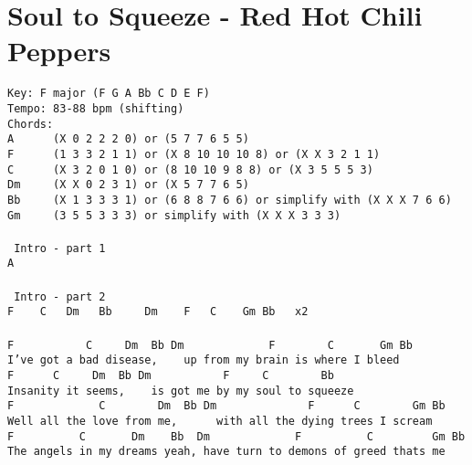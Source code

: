 \newpage
\section{Soul to Squeeze - Red Hot Chili Peppers}
\label{Soul to Squeeze - Red Hot Chili Peppers}
\texttt{Key:\ F\ major\ (F\ G\ A\ Bb\ C\ D\ E\ F)\\
Tempo:\ 83-88\ bpm\ (shifting)\\
Chords:\\
A\ \ \ \ \ \ (X\ 0\ 2\ 2\ 2\ 0)\ or\ (5\ 7\ 7\ 6\ 5\ 5)\\
F\ \ \ \ \ \ (1\ 3\ 3\ 2\ 1\ 1)\ or\ (X\ 8\ 10\ 10\ 10\ 8)\ or\ (X\ X\ 3\ 2\ 1\ 1)\\
C\ \ \ \ \ \ (X\ 3\ 2\ 0\ 1\ 0)\ or\ (8\ 10\ 10\ 9\ 8\ 8)\ or\ (X\ 3\ 5\ 5\ 5\ 3)\\
Dm\ \ \ \ \ (X\ X\ 0\ 2\ 3\ 1)\ or\ (X\ 5\ 7\ 7\ 6\ 5)\\
Bb\ \ \ \ \ (X\ 1\ 3\ 3\ 3\ 1)\ or\ (6\ 8\ 8\ 7\ 6\ 6)\ or\ simplify\ with\ (X\ X\ X\ 7\ 6\ 6)\\
Gm\ \ \ \ \ (3\ 5\ 5\ 3\ 3\ 3)\ or\ simplify\ with\ (X\ X\ X\ 3\ 3\ 3)\\
\\
\lbrack\ Intro\ -\ part\ 1\rbrack\\
A\\
\\
\lbrack\ Intro\ -\ part\ 2\rbrack\\
F\ \ \ \ C\ \ \ Dm\ \ \ Bb\ \ \ \ \ Dm\ \ \ \ F\ \ \ C\ \ \ \ Gm\ Bb\ \ \ x2\\
\\
F\ \ \ \ \ \ \ \ \ \ \ C\ \ \ \ \ Dm\ \ Bb\ Dm\ \ \ \ \ \ \ \ \ \ \ \ \ F\ \ \ \ \ \ \ \ C\ \ \ \ \ \ \ Gm\ Bb\\
I've\ got\ a\ bad\ disease,\ \ \ \ up\ from\ my\ brain\ is\ where\ I\ bleed\\
F\ \ \ \ \ \ C\ \ \ \ \ Dm\ \ Bb\ Dm\ \ \ \ \ \ \ \ \ \ \ F\ \ \ \ \ C\ \ \ \ \ \ \ \ Bb\\
Insanity\ it\ seems,\ \ \ \ is\ got\ me\ by\ my\ soul\ to\ squeeze\\
F\ \ \ \ \ \ \ \ \ \ \ \ \ C\ \ \ \ \ \ \ \ Dm\ \ Bb\ Dm\ \ \ \ \ \ \ \ \ \ \ \ \ \ F\ \ \ \ \ \ C\ \ \ \ \ \ \ \ Gm\ Bb\\
Well\ all\ the\ love\ from\ me,\ \ \ \ \ \ with\ all\ the\ dying\ trees\ I\ scream\\
F\ \ \ \ \ \ \ \ \ \ C\ \ \ \ \ \ \ Dm\ \ \ \ Bb\ \ Dm\ \ \ \ \ \ \ \ \ \ \ \ \ F\ \ \ \ \ \ \ \ \ \ C\ \ \ \ \ \ \ \ \ Gm\ Bb\\
The\ angels\ in\ my\ dreams\ yeah,\ have\ turn\ to\ demons\ of\ greed\ thats\ me\\
}
